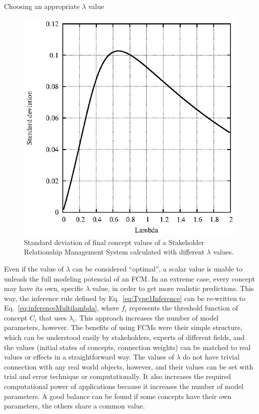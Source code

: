 \documentclass[graybox]{svmult}
\begin{document}
\begin{backgroundinformation}{Choosing an appropriate $\lambda$ value}
\begin{figure}[hbt]
  \begin{center}
    \includegraphics[scale=.9]{ascc2015plots/stdDev.eps}
  \end{center}
  \caption{Standard deviation of final concept values of a Stakeholder Relationship Management System calculated with different $\lambda$ values.}
  \label{fig:standardDeviation}
\end{figure}

Even if the value of $\lambda$ can be considered ``optimal'', a scalar value is unable to unleash the full modeling potencial of an FCM. In an extreme case, every concept may have its own, specific $\lambda$ value, in order to get more realistic predictions. This way, the inference rule defined by Eq.~\ref{eq:Type1Inference} can be re-written to Eq.~\ref{eq:inferenceMultilambda}, where $f_i$ represents the threshold function of concept $C_i$ that uses $\lambda_i$. This approach increases the number of model parameters, however. The benefits of using FCMs were their simple structure, which can be understood easily by stakeholders, experts of different fields, and the values (initial states of concepts, connection weights) can be matched to real values or effects in a straightforward way. The values of $\lambda$ do not have trivial connection with any real world objects, however, and their values can be set with trial and error technique or computationally. It also increases the required computational power of applications because it increases the number of model parameters. A good balance can be found if some concepts have their own parameters, the others share a common value.


\end{backgroundinformation}
\end{document}
